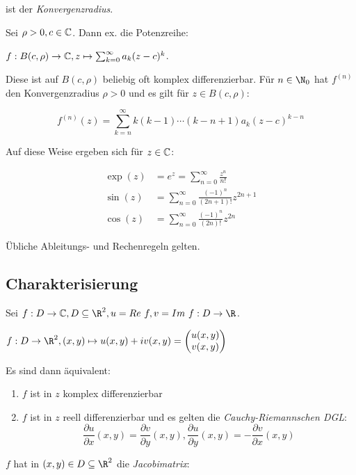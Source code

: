 ist der \emph{Konvergenzradius}.

Sei $\rho > 0, c \in \mathbb{C}$. Dann ex. die Potenzreihe:

$f : B(c,\rho) \to \mathbb{C}, z \mapsto \sum_{k=0}^\infty a_k(z-c)^k$.

Diese ist auf $B(c,\rho)$ beliebig oft komplex differenzierbar. Für $n \in \N_0$ hat $f^{(n)}$ den Konvergenzradius $\rho > 0$ und es gilt für $z \in B(c,\rho)$:

\vspace*{-4mm}
$$f^{(n)}(z) = \sum_{k=n}^\infty k(k-1)\cdots(k-n+1)a_k(z-c)^{k-n}$$

Auf diese Weise ergeben sich für $z \in \mathbb{C}$:

\vspace*{-4mm}
\begin{align*}
	\exp(z) &= e^z = \sum_{n=0}^\infty \frac{z^n}{n!} \\
	\sin(z) &= \sum_{n=0}^\infty \frac{(-1)^n}{(2n+1)!} z^{2n+1} \\
	\cos(z) &= \sum_{n=0}^\infty \frac{(-1)^n}{(2n)!} z^{2n}
\end{align*}

Übliche Ableitungs- und Rechenregeln gelten.

\subsection*{Charakterisierung}

Sei $f : D \to \C, D \subseteq \R^2, u = Re \ f, v = Im \ f : D \to \R$.

$f : D \to \R^2, (x,y) \mapsto u(x,y) + iv(x,y) = \begin{pmatrix} u(x,y) \\ v(x,y)\end{pmatrix}$

Es sind dann äquivalent:

\begin{enumerate}[label=(\alph*)]
	\item $f$ ist in $z$ komplex differenzierbar
	\item $f$ ist in $z$ reell differenzierbar und es gelten die \emph{Cauchy-Riemannschen DGL}: \\
		$$\frac{\partial u}{\partial x}(x,y) = \frac{\partial v}{\partial y}(x,y), \frac{\partial u}{\partial y}(x,y) = -\frac{\partial v}{\partial x}(x,y)$$
\end{enumerate}

$f$ hat in $(x,y) \in D \subseteq \R^2$ die \emph{Jacobimatrix}:

